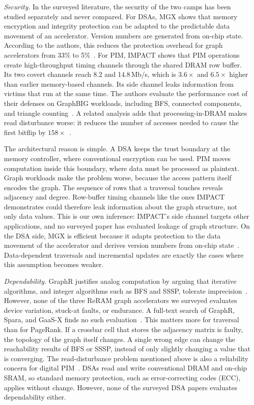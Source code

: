 \documentclass[journal,onecolumn]{IEEEtran}
\begin{document}
\emph{Security.} In the surveyed literature, the security of the two camps has been studied separately and never compared. For DSAs, MGX shows that memory encryption and integrity protection can be adapted to the predictable data movement of an accelerator. Version numbers are generated from on-chip state. According to the authors, this reduces the protection overhead for graph accelerators from 33\% to 5\%~\cite{hua2022mgx}. For PIM, IMPACT shows that PIM operations create high-throughput timing channels through the shared DRAM row buffer. Its two covert channels reach 8.2 and 14.8\,Mb/s, which is $3.6\times$ and $6.5\times$ higher than earlier memory-based channels. Its side channel leaks information from victims that run at the same time. The authors evaluate the performance cost of their defenses on GraphBIG workloads, including BFS, connected components, and triangle counting~\cite{bostanci2025impact}. A related analysis adds that processing-in-DRAM makes read disturbance worse: it reduces the number of accesses needed to cause the first bitflip by $158\times$~\cite{yuksel2026pid}.

The architectural reason is simple. A DSA keeps the trust boundary at the memory controller, where conventional encryption can be used. PIM moves computation inside this boundary, where data must be processed as plaintext. Graph workloads make the problem worse, because the access pattern itself encodes the graph. The sequence of rows that a traversal touches reveals adjacency and degree. Row-buffer timing channels like the ones IMPACT demonstrates could therefore leak information about the graph structure, not only data values. This is our own inference: IMPACT's side channel targets other applications, and no surveyed paper has evaluated leakage of graph structure. On the DSA side, MGX is efficient because it adapts protection to the data movement of the accelerator and derives version numbers from on-chip state~\cite{hua2022mgx}. Data-dependent traversals and incremental updates are exactly the cases where this assumption becomes weaker.

\emph{Dependability.} GraphR justifies analog computation by arguing that iterative algorithms, and integer algorithms such as BFS and SSSP, tolerate imprecision~\cite{song2018graphr}. However, none of the three ReRAM graph accelerators we surveyed evaluates device variation, stuck-at faults, or endurance. A full-text search of GraphR, Spara, and GaaS-X finds no such evaluation~\cite{song2018graphr,zheng2020spara,challapalle2020gaasx}. This matters more for traversal than for PageRank. If a crossbar cell that stores the adjacency matrix is faulty, the topology of the graph itself changes. A single wrong edge can change the reachability results of BFS or SSSP, instead of only slightly changing a value that is converging. The read-disturbance problem mentioned above is also a reliability concern for digital PIM~\cite{yuksel2026pid}. DSAs read and write conventional DRAM and on-chip SRAM, so standard memory protection, such as error-correcting codes (ECC), applies without change. However, none of the surveyed DSA papers evaluates dependability either.
\end{document}
